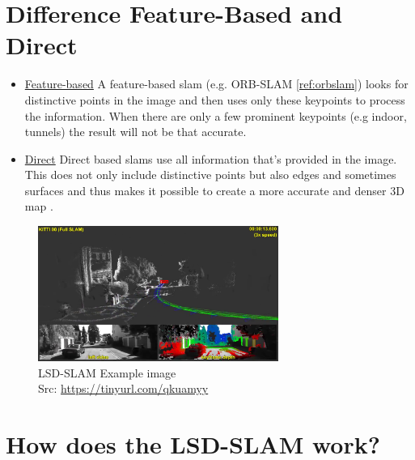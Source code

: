\section{Difference Feature-Based and Direct}
\begin{itemize}
    \item \underline{Feature-based} \newline
        A feature-based \gls{slam} (e.g. ORB-SLAM \ref{ref:orbslam}) looks for distinctive points in the image and then uses only these keypoints to process the information. When there are only a few prominent keypoints (e.g indoor, tunnels) the result will not be that accurate.
    \item \underline{Direct} \newline
        Direct based \gls{slam}s use all information that's provided in the image. This does not only include distinctive points but also edges and sometimes surfaces and thus makes it possible to create a more accurate and denser 3D map \cite{lsdslam_eccv}.
\end{itemize}
\begin{figure}[h]
	\centering
	\includegraphics[width=0.7\textwidth]{./media/images/lsd-slam.png}
  	\caption{LSD-SLAM Example image
  	\\Src: \url{https://tinyurl.com/qkuamyy}}
  	\label{lsdslam}
\end{figure}

\section{How does the LSD-SLAM work?}

